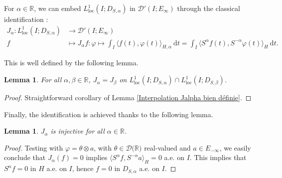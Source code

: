 \documentclass[11pt, letterpaper]{amsart}
\newtheorem{lem}[thm]{Lemma}
\theoremstyle{definition}
\theoremstyle{remark}
\numberwithin{equation}{section}
\begin{document}
 For $\alpha \in \mathbb{R}$, we can embed $L^1_{\mathrm{loc}}(I; D_{S,\alpha})$ in  $\mathcal{D}'\left ( I ; E_\infty \right )$ through the classical identification :
\begin{align*}
J_\alpha \colon L^1_{\mathrm{loc}}(I; D_{S,\alpha})   & \rightarrow  \mathcal{D}'\left ( I ; E_\infty \right )\\
f&\mapsto J_\alpha f :  \varphi \mapsto \int_{I} \langle f(t) ,\varphi(t)  \rangle_{H,\alpha} \ \mathrm{d} t = \int_{I } \langle S^\alpha f(t) ,S^{-\alpha }\varphi(t)  \rangle_H \ \mathrm{d} t.
\end{align*}
{This is well defined by the following lemma.
\begin{lem}\label{lem: Jalpha bien définie}
 For all $\alpha, \beta \in \mathbb{R}$, $J_\alpha = J_\beta $ on $L^1_{\mathrm{loc}}(I; D_{S,\alpha}) \cap L^1_{\mathrm{loc}}(I; D_{S,\beta})$. 
\end{lem}
\begin{proof}
    Straightforward corollary of Lemma \ref{Interpolation Jalpha bien définie}.
\end{proof}
Finally, the identification is achieved thanks to the following lemma.}
\begin{lem}
     $J_\alpha$ is injective for all $\alpha \in \mathbb{R}$.
\end{lem}
\begin{proof}
Testing with $\varphi = \theta \otimes a$, with $\theta\in \mathcal{D}(\mathbb{R)}$ real-valued and $a\in E_{-\infty}$, we easily conclude that $J_\alpha(f)=0$ implies $\langle S^\alpha f, S^{-\alpha} a\rangle_H=0$ a.e. on $I$. This implies that $S^\alpha f=0$ in $H$ a.e. on $I$, hence $f=0$ in $D_{S,\alpha}$  a.e. on $I$.
\end{proof}
\end{document}
